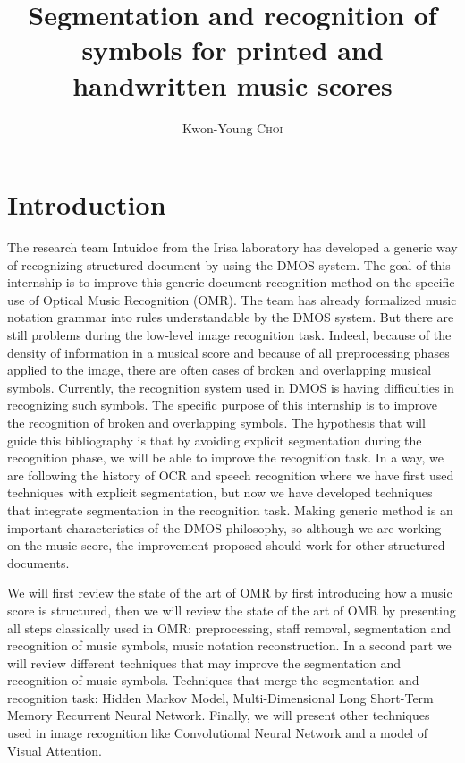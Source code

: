 \documentclass[11pt]{sdm}
\title{Segmentation and recognition of symbols for printed and handwritten music scores}
\author{Kwon-Young \textsc{Choi}}
\begin{document}
\maketitle


\section{Introduction}

The research team Intuidoc from the Irisa laboratory has developed a generic way of recognizing structured document by using the DMOS system.
The goal of this internship is to improve this generic document recognition method on the specific use of Optical Music Recognition (OMR).
The team has already formalized music notation grammar into rules understandable by the DMOS system.
But there are still problems during the low-level image recognition task.
Indeed, because of the density of information in a musical score and because of all preprocessing phases applied to the image, there are often cases of broken and overlapping musical symbols.
Currently, the recognition system used in DMOS is having difficulties in recognizing such symbols.
The specific purpose of this internship is to improve the recognition of broken and overlapping symbols.
The hypothesis that will guide this bibliography is that by avoiding explicit segmentation during the recognition phase, we will be able to improve the recognition task.
In a way, we are following the history of OCR and speech recognition where we have first used techniques with explicit segmentation, but now we have developed techniques that integrate segmentation in the recognition task.
Making generic method is an important characteristics of the DMOS philosophy, so although we are working on the music score, the improvement proposed should work for other structured documents.

We will first review the state of the art of OMR by first introducing how a music score is structured, then we will review the state of the art of OMR by presenting all steps classically used in OMR: preprocessing, staff removal, segmentation and recognition of music symbols, music notation reconstruction.
In a second part we will review different techniques that may improve the segmentation and recognition of music symbols.
Techniques that merge the segmentation and recognition task: Hidden Markov Model, Multi-Dimensional Long Short-Term Memory Recurrent Neural Network.
Finally, we will present other techniques used in image recognition like Convolutional Neural Network and a model of Visual Attention.
\end{document}
